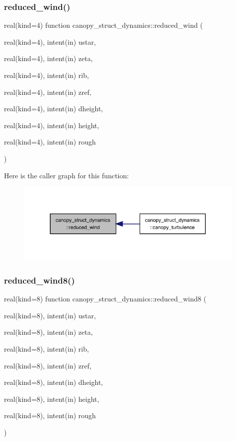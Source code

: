 \subsubsection{\texorpdfstring{reduced\+\_\+wind()}{reduced\_wind()}}
{\footnotesize\ttfamily real(kind=4) function canopy\+\_\+struct\+\_\+dynamics\+::reduced\+\_\+wind (\begin{DoxyParamCaption}\item[{real(kind=4), intent(in)}]{ustar,  }\item[{real(kind=4), intent(in)}]{zeta,  }\item[{real(kind=4), intent(in)}]{rib,  }\item[{real(kind=4), intent(in)}]{zref,  }\item[{real(kind=4), intent(in)}]{dheight,  }\item[{real(kind=4), intent(in)}]{height,  }\item[{real(kind=4), intent(in)}]{rough }\end{DoxyParamCaption})}

Here is the caller graph for this function\+:
\nopagebreak
\begin{figure}[H]
\begin{center}
\leavevmode
\includegraphics[width=314pt]{namespacecanopy__struct__dynamics_ae5504447c798d15053109bc4f8ff9346_icgraph}
\end{center}
\end{figure}
\mbox{\label{namespacecanopy__struct__dynamics_a4bfef6570fcebda5f22600fd0660ee0c}} 
\subsubsection{\texorpdfstring{reduced\+\_\+wind8()}{reduced\_wind8()}}
{\footnotesize\ttfamily real(kind=8) function canopy\+\_\+struct\+\_\+dynamics\+::reduced\+\_\+wind8 (\begin{DoxyParamCaption}\item[{real(kind=8), intent(in)}]{ustar,  }\item[{real(kind=8), intent(in)}]{zeta,  }\item[{real(kind=8), intent(in)}]{rib,  }\item[{real(kind=8), intent(in)}]{zref,  }\item[{real(kind=8), intent(in)}]{dheight,  }\item[{real(kind=8), intent(in)}]{height,  }\item[{real(kind=8), intent(in)}]{rough }\end{DoxyParamCaption})}

